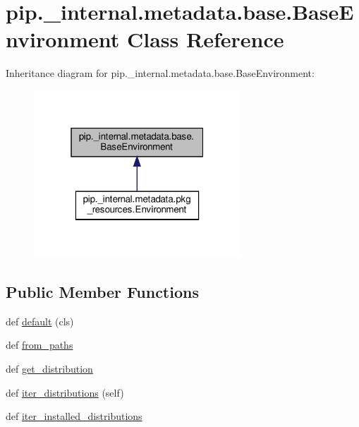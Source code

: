 \hypertarget{classpip_1_1__internal_1_1metadata_1_1base_1_1BaseEnvironment}{}\section{pip.\+\_\+internal.\+metadata.\+base.\+Base\+Environment Class Reference}
\label{classpip_1_1__internal_1_1metadata_1_1base_1_1BaseEnvironment}


Inheritance diagram for pip.\+\_\+internal.\+metadata.\+base.\+Base\+Environment\+:
\nopagebreak
\begin{figure}[H]
\begin{center}
\leavevmode
\includegraphics[width=220pt]{classpip_1_1__internal_1_1metadata_1_1base_1_1BaseEnvironment__inherit__graph}
\end{center}
\end{figure}
\subsection*{Public Member Functions}
\begin{DoxyCompactItemize}
\item 
def \hyperlink{classpip_1_1__internal_1_1metadata_1_1base_1_1BaseEnvironment_aec5710e94df4692b51364a3f4f8c1132}{default} (cls)
\item 
def \hyperlink{classpip_1_1__internal_1_1metadata_1_1base_1_1BaseEnvironment_a7f0adb4e01fcb0ea7179e41e765302d6}{from\+\_\+paths}
\item 
def \hyperlink{classpip_1_1__internal_1_1metadata_1_1base_1_1BaseEnvironment_a7026ea6470e5e36d80da8761ccfaad09}{get\+\_\+distribution}
\item 
def \hyperlink{classpip_1_1__internal_1_1metadata_1_1base_1_1BaseEnvironment_ad5f751d04b7876fcb22477852aa1c683}{iter\+\_\+distributions} (self)
\item 
def \hyperlink{classpip_1_1__internal_1_1metadata_1_1base_1_1BaseEnvironment_a931e261532a5e8651e41823dc967eec1}{iter\+\_\+installed\+\_\+distributions}
\end{DoxyCompactItemize}
